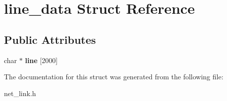 \hypertarget{structline__data}{\section{line\-\_\-data Struct Reference}
\label{structline__data}
}
\subsection*{Public Attributes}
\begin{DoxyCompactItemize}
\item 
\hypertarget{structline__data_a4816bb0d74edb1f96f72c9aeb0f4d5b6}{char $\ast$ {\bfseries line} \mbox{[}2000\mbox{]}}\label{structline__data_a4816bb0d74edb1f96f72c9aeb0f4d5b6}

\end{DoxyCompactItemize}


The documentation for this struct was generated from the following file\-:\begin{DoxyCompactItemize}
\item 
net\-\_\-link.\-h\end{DoxyCompactItemize}
